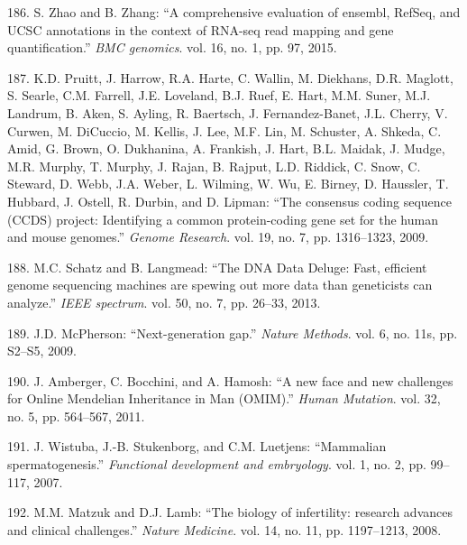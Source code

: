 \documentclass[12pt,a4paper,twoside]{ugathesis}
\theoremstyle{definition}
\theoremstyle{definition}
\theoremstyle{definition}
\theoremstyle{remark}
\begin{document}
\hypertarget{ref-Zhao2015}{}
186. S. Zhao and B. Zhang: ``A comprehensive evaluation of ensembl,
RefSeq, and UCSC annotations in the context of RNA-seq read mapping and
gene quantification.'' \emph{BMC genomics}. vol. 16, no. 1, pp. 97,
2015.

\hypertarget{ref-Pruitt2009}{}
187. K.D. Pruitt, J. Harrow, R.A. Harte, C. Wallin, M. Diekhans, D.R.
Maglott, S. Searle, C.M. Farrell, J.E. Loveland, B.J. Ruef, E. Hart,
M.M. Suner, M.J. Landrum, B. Aken, S. Ayling, R. Baertsch, J.
Fernandez-Banet, J.L. Cherry, V. Curwen, M. DiCuccio, M. Kellis, J. Lee,
M.F. Lin, M. Schuster, A. Shkeda, C. Amid, G. Brown, O. Dukhanina, A.
Frankish, J. Hart, B.L. Maidak, J. Mudge, M.R. Murphy, T. Murphy, J.
Rajan, B. Rajput, L.D. Riddick, C. Snow, C. Steward, D. Webb, J.A.
Weber, L. Wilming, W. Wu, E. Birney, D. Haussler, T. Hubbard, J. Ostell,
R. Durbin, and D. Lipman: ``The consensus coding sequence (CCDS)
project: Identifying a common protein-coding gene set for the human and
mouse genomes.'' \emph{Genome Research}. vol. 19, no. 7, pp. 1316--1323,
2009.

\hypertarget{ref-Schatz2013}{}
188. M.C. Schatz and B. Langmead: ``The DNA Data Deluge: Fast, efficient
genome sequencing machines are spewing out more data than geneticists
can analyze.'' \emph{IEEE spectrum}. vol. 50, no. 7, pp. 26--33, 2013.

\hypertarget{ref-McPherson2009}{}
189. J.D. McPherson: ``Next-generation gap.'' \emph{Nature Methods}.
vol. 6, no. 11s, pp. S2--S5, 2009.

\hypertarget{ref-Amberger2011}{}
190. J. Amberger, C. Bocchini, and A. Hamosh: ``A new face and new
challenges for Online Mendelian Inheritance in Man (OMIM).'' \emph{Human
Mutation}. vol. 32, no. 5, pp. 564--567, 2011.

\hypertarget{ref-wistuba2007mammalian}{}
191. J. Wistuba, J.-B. Stukenborg, and C.M. Luetjens: ``Mammalian
spermatogenesis.'' \emph{Functional development and embryology}. vol. 1,
no. 2, pp. 99--117, 2007.

\hypertarget{ref-Matzuk2008}{}
192. M.M. Matzuk and D.J. Lamb: ``The biology of infertility: research
advances and clinical challenges.'' \emph{Nature Medicine}. vol. 14, no.
11, pp. 1197--1213, 2008.


\end{document}
